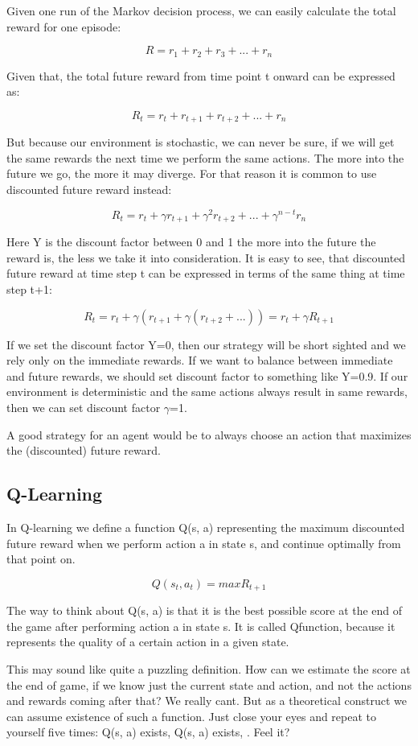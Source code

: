 \documentclass[a4paper,11pt]{report}
\begin{document}
				Given one run of the Markov decision process, we can easily calculate the total reward for one episode:

				\[ R = r_1 + r_2 + r_3 + ... + r_n \]

				Given that, the total future reward from time point t onward can be expressed as:

				\[ R_t = r_t + r_{t+1} + r_{t+2} + ... + r_n \]

				But because our environment is stochastic, we can never be sure, if we will get the same rewards the next time we perform the same actions. The more into the future we go, the more it may diverge. For that reason it is common to use discounted future reward instead:

				\[ R_t = r_t + {\gamma}r_{t+1} + {\gamma}^2r_{t+2} + ... + {\gamma}^{n-t}r_n\]

				Here Y is the discount factor between 0 and 1 the more into the future the reward is, the less we take it into consideration. It is easy to see, that discounted future reward at time step t can be expressed in terms of the same thing at time step t+1:

				\[ R_t = r_t + \gamma(r_{t+1} + \gamma(r_{t+2} + ...)) = r_t + {\gamma}R_{t+1}\]

				If we set the discount factor Y=0, then our strategy will be short sighted and we rely only on the immediate rewards. If we want to balance between immediate and future rewards, we should set discount factor to something like Y=0.9. If our environment is deterministic and the same actions always result in same rewards, then we can set discount factor $\gamma$=1.

				A good strategy for an agent would be to always choose an action that maximizes the (discounted) future reward.
			\subsection{Q-Learning}
				In Q-learning we define a function Q(s, a) representing the maximum discounted future reward when we perform action a in state s, and continue optimally from that point on.

				\[ Q(s_t, a_t) = max R_{t+1}\]

				The way to think about Q(s, a) is that it is the best possible score at the end of the game after performing action a in state s. It is called Qfunction, because it represents the quality of a certain action in a given state.

				This may sound like quite a puzzling definition. How can we estimate the score at the end of game, if we know just the current state and action, and not the actions and rewards coming after that? We really cant. But as a theoretical construct we can assume existence of such a function. Just close your eyes and repeat to yourself five times: Q(s, a) exists, Q(s, a) exists, . Feel it?
\end{document}
